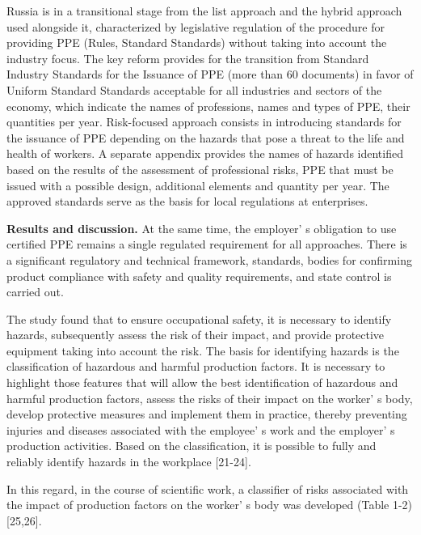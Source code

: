 \begin{multicols}{2}
Russia is in a transitional stage from the list approach and the hybrid
approach used alongside it, characterized by legislative regulation of
the procedure for providing PPE (Rules, Standard Standards) without
taking into account the industry focus. The key reform provides for the
transition from Standard Industry Standards for the Issuance of PPE
(more than 60 documents) in favor of Uniform Standard Standards
acceptable for all industries and sectors of the economy, which indicate
the names of professions, names and types of PPE, their quantities per
year. Risk-focused approach consists in introducing standards for the
issuance of PPE depending on the hazards that pose a threat to the life
and health of workers. A separate appendix provides the names of hazards
identified based on the results of the assessment of professional risks,
PPE that must be issued with a possible design, additional elements and
quantity per year. The approved standards serve as the basis for local
regulations at enterprises.

{\bfseries Results and discussion.} At the same time, the
employer' s obligation to use certified PPE remains a
single regulated requirement for all approaches. There is a significant
regulatory and technical framework, standards, bodies for confirming
product compliance with safety and quality requirements, and state
control is carried out.

The study found that to ensure occupational safety, it is necessary to
identify hazards, subsequently assess the risk of their impact, and
provide protective equipment taking into account the risk. The basis for
identifying hazards is the classification of hazardous and harmful
production factors. It is necessary to highlight those features that
will allow the best identification of hazardous and harmful production
factors, assess the risks of their impact on the
worker' s body, develop protective measures and implement
them in practice, thereby preventing injuries and diseases associated
with the employee' s work and the
employer' s production activities. Based on the
classification, it is possible to fully and reliably identify hazards in
the workplace {[}21-24{]}.

In this regard, in the course of scientific work, a classifier of risks
associated with the impact of production factors on the
worker' s body was developed (Table 1-2) {[}25,26{]}.
\end{multicols}

